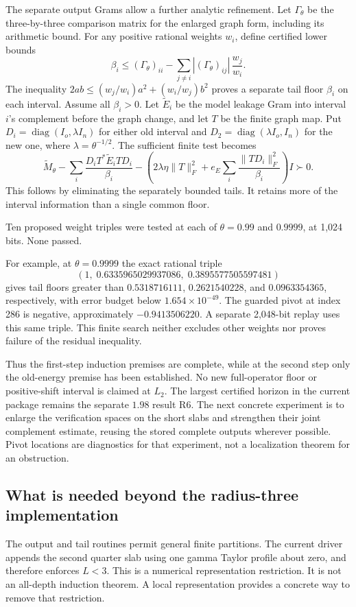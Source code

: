 The separate output Grams allow a further analytic refinement. Let
\(\Gamma_\theta\) be the three-by-three comparison matrix for the enlarged
graph form, including its arithmetic bound. For any positive rational
weights \(w_i\), define certified lower bounds
\[
 \beta_i\le(\Gamma_\theta)_{ii}
       -\sum_{j\ne i}|(\Gamma_\theta)_{ij}|\,\frac{w_j}{w_i}.
\]
The inequality \(2ab\le(w_j/w_i)a^2+(w_i/w_j)b^2\) proves a separate
tail floor \(\beta_i\) on each interval. Assume all \(\beta_i>0\).
Let \(\widetilde E_i\) be the model leakage Gram into interval \(i\)'s
complement before the graph change, and let \(T\) be the finite graph map.
Put \(D_i=\operatorname{diag}(I_o,\lambda I_n)\) for either old interval
and \(D_2=\operatorname{diag}(\lambda I_o,I_n)\) for the new one,
where \(\lambda=\theta^{-1/2}\).
The sufficient finite test becomes
\[
 \widetilde M_\theta-
 \sum_i\frac{D_iT^*\widetilde E_iTD_i}{\beta_i}
 -
 \left(2\lambda\eta\|T\|_F^2+
       e_E\sum_i\frac{\|TD_i\|_F^2}{\beta_i}\right)I
 \succ0.
\]
This follows by eliminating the separately bounded tails. It retains more
of the interval information than a single common floor.

Ten proposed weight triples were tested at each of \(\theta=0.99\) and
\(0.9999\), at 1,024 bits. None passed.
\begin{samepage}
\noindent For example, at \(\theta=0.9999\)
the exact rational triple
\[
 (1,\;0.6335965029937086,\;0.3895577505597481)
\]
gives tail floors greater than \(0.5318716111\), \(0.2621540228\), and
\(0.0963354365\), respectively, with error budget below
\(1.654\times10^{-49}\). The guarded pivot at index 286 is negative,
approximately \(-0.9413506220\). A separate 2,048-bit replay uses this
same triple. This finite search neither excludes other weights nor
proves failure of the residual inequality.
\end{samepage}

Thus the first-step induction premises are complete, while at the second
step only the old-energy premise has been established. No new full-operator
floor or positive-shift interval is claimed at \(L_2\). The largest certified
horizon in the current package remains the separate \(1.98\) result R6.
The next concrete experiment is to enlarge the verification spaces on the
short slabs and strengthen their joint complement estimate, reusing the
stored complete outputs wherever possible. Pivot locations are diagnostics
for that experiment, not a localization theorem for an obstruction.

\subsection{What is needed beyond the radius-three implementation}
The output and tail routines permit general finite partitions. The current
driver appends the second quarter slab using one gamma Taylor profile about
zero, and therefore enforces \(L<3\). This is a numerical
representation restriction. It is not an all-depth induction theorem.
A local representation provides a concrete way to remove that restriction.


